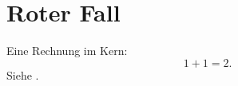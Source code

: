 \chapter{Roter Fall}\label{c99}

Eine Rechnung im Kern:
\begin{equation}\label{c99.eq.eins}
  1 + 1 = 2.
\end{equation}
Siehe .
